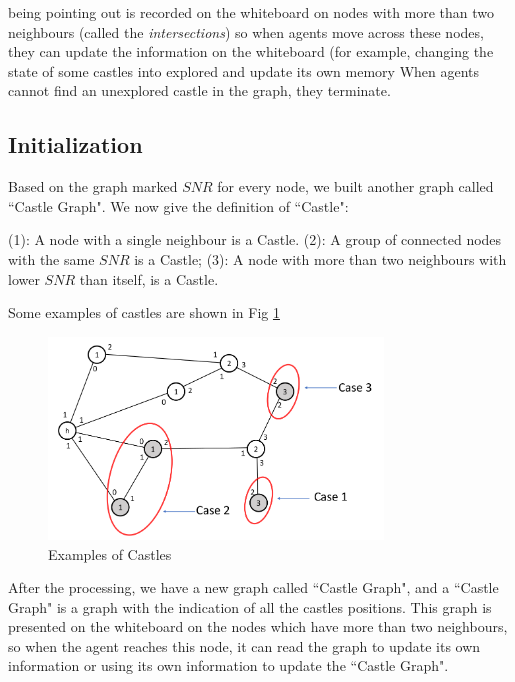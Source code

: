 being pointing out is recorded on the whiteboard on nodes with more than two neighbours (called the {\em intersections}) so when agents move across these nodes, they can update the information on the whiteboard (for example, changing the state of some castles into explored and update its own memory %
When agents cannot find an unexplored castle in the graph,  they terminate. 

\subsection{ Initialization}
Based on the graph marked $SNR$ for every node, we built another graph called ``Castle Graph". 
We now give the definition of ``Castle":
\begin{definition}
\noindent (1): A node with a single neighbour is a Castle.
\noindent (2): A group of connected nodes with the same $SNR$  is a Castle;
\noindent (3): A node with more than two neighbours with lower $SNR$ than itself, is  a Castle.
\end{definition}
 

Some examples of castles are shown in Fig  \ref{fig:CastleExample}
\begin{figure}[H]
  \centering  
  \includegraphics[width=3.5in]{figures/CastleExample.png}
  \caption{Examples of Castles}\label{fig:CastleExample}
\end{figure} 

After the processing, we have a new graph called ``Castle Graph", and a ``Castle Graph" is a graph with the indication of all the castles positions. This graph is presented on the whiteboard on the nodes which have more than two neighbours, so when the agent reaches this node, it can read the graph to update its own information or using its own information to update the ``Castle Graph". 

